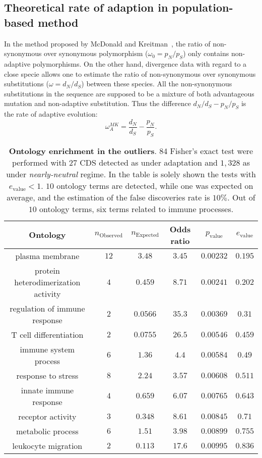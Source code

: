 \documentclass{article}
\begin{document}
\subsection*{Theoretical rate of adaption in population-based method}
In the method proposed by McDonald and Kreitman~\citep{McDonald1991}, the ratio of non-synonymous over synonymous polymorphism ($\omega_{0}=p_N/p_S$) only contains non-adaptive polymorphisms.
On the other hand, divergence data with regard to a close specie allows one to estimate the ratio of non-synonymous over synonymous substitutions ($\omega=d_N/d_S$) between these species.
All the non-synonymous substitutions in the sequence are supposed to be a mixture of both advantageous mutation and non-adaptive substitution.
Thus the difference $d_N/d_S - p_N/p_S$ is the rate of adaptive evolution:
\begin{equation*}
\omega_A^{MK}=\dfrac{d_N}{d_S} - \dfrac{p_N}{p_S}.
\end{equation*}	\begin{table*}[hb!]
	\centering
	\begin{adjustbox}{width = 1\textwidth}
		\small\begin{tabular}{|c|c|c|c|c|c|}
			\hline
			Ontology & $n_{\mathrm{Observed}}$ & $n_{\mathrm{Expected}}$ & Odds ratio & $p_{\mathrm{value}}$ & $e_{\mathrm{value}}$		\\
			\hline
			plasma membrane & $12$ & $3.48$ & $3.45$ & $0.00232$ & $0.195$ \\
			protein heterodimerization activity & $4$ & $0.459$ & $8.71$ & $0.00241$ & $0.202$  \\
			regulation of immune response & $2$ & $0.0566$ & $35.3$ & $0.00369$ & $0.31$ \\
			T cell differentiation & $2$ & $0.0755$ & $26.5$ & $0.00546$ & $0.459$  \\
			immune system process & $6$ & $1.36$ & $4.4$ & $0.00584$ & $0.49$  \\
			response to stress & $8$ & $2.24$ & $3.57$ & $0.00608$ & $0.511$  \\
			innate immune response & $4$ & $0.659$ & $6.07$ & $0.00765$ & $0.643$  \\
			receptor activity & $3$ & $0.348$ & $8.61$ & $0.00845$ & $0.71$  \\
			metabolic process & $6$ & $1.51$ & $3.98$ & $0.00899$ & $0.755$	 \\
			leukocyte migration & $2$ & $0.113$ & $17.6$ & $0.00995$ & $0.836$  \\
			\hline
		\end{tabular}
	\end{adjustbox}
	\caption{\textbf{Ontology enrichment in the outliers}.
84 Fisher's exact test were performed with $27$ CDS detected as under adaptation and $1,328$ as under \textit{nearly-neutral} regime.
In the table is solely shown the tests with $e_{\mathrm{value}} < 1$.
$10$ ontology terms are detected, while one was expected on average, and the estimation of the false discoveries rate is $10\%$.
Out of $10$ ontology terms, six terms related to immune processes.
\label{fig:ontology}}
\end{table*}
\end{document}
